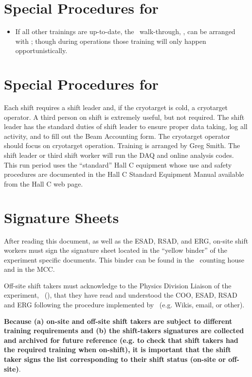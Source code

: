 %
\newpage
\section{Special Procedures for \HALL}

\begin{itemize}

\item{
If all other trainings are up-to-date, the \HALL\ walk-through, \AWARENESS, can be arranged 
with {\WALKTHROUGHTRAINER}; 
though during operations those training will only 
happen opportunistically.   
}
\end{itemize}

%
\newpage
\section{Special Procedures for \EXPTS}

Each shift requires a shift leader and, if the cryotarget is cold, a cryotarget 
operator.  A third person on shift is extremely useful, but not required. The shift leader 
has the standard
duties of shift leader to ensure proper data taking, log all activity, and to fill out
the Beam Accounting form. The cryotarget operator should focus on cryotarget
operation. Training is arranged by Greg Smith. The shift leader or third
shift worker will run the DAQ and online analysis codes.
This run period uses the ``standard'' Hall C equipment whose
use and safety procedures are documented in the Hall C Standard Equipment
Manual available from the Hall C web page.


\newpage
\section{Signature Sheets}

After reading this document, as well as the ESAD, RSAD, and ERG, on-site shift workers must sign
the signature sheet located in the ``yellow binder'' of the experiment specific documents.
This binder can be found in the \HALL\ counting house and in the MCC.

Off-site shift takers must acknowledge to the Physics Division Liaison of the experiment, \PHYSDIVLIAISON\ (\PHYSDIVLIAISONEMAIL),
that they have read and understood the COO, ESAD, RSAD and ERG following the procedure implemented by \HALL\ (e.g. Wikis, email, or other).

{\bf Because (a) on-site and off-site shift takers are subject to different training requirements and (b) the shift-takers signatures are collected and archived for future reference (e.g. to check that shift takers had the required training when on-shift), it is important that the shift taker signs the list corresponding to their shift status (on-site or off-site)}.
